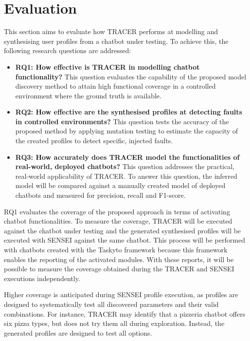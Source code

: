 
\chapter{Evaluation}\label{chapter:evaluation}

This section aims to
evaluate how \ac{TRACER} performs at
modelling and synthesising user profiles
from a chatbot under testing.
To achieve this, the following research questions are addressed:

\begin{itemize}
\item \textbf{RQ1: How effective is TRACER in modelling chatbot functionality?}
  This question evaluates the capability of the proposed model discovery method to attain high functional coverage in a controlled environment where the ground truth is available.
\item \textbf{RQ2: How effective are the synthesised profiles at detecting faults in controlled environments?}
  This question tests the accuracy of the proposed method by applying mutation testing \autocite{gomez-abajoMutationTestingTaskOriented2024} to estimate the capacity of the created profiles to detect specific, injected faults.
\item \textbf{RQ3: How accurately does TRACER model the functionalities of real-world, deployed chatbots?}
  This question addresses the practical, real-world applicability of \ac{TRACER}.
  To answer this question, the inferred model will be compared against a manually created model of deployed chatbots and measured for precision, recall and F1-score.
\end{itemize}

RQ1 evaluates the coverage of the proposed approach
in terms of activating chatbot functionalities.
To measure the coverage, \ac{TRACER} will be executed
against the chatbot under testing
and the generated synthesised profiles
will be executed with SENSEI against the same chatbot.
This process will be performed with chatbots created with the Taskyto framework
because this framework enables the reporting of the activated modules.
With these reports, it will be possible to measure
the coverage obtained during the \ac{TRACER} and SENSEI executions independently.

Higher coverage is anticipated during SENSEI profile execution,
as profiles are designed to systematically test all discovered parameters
and their valid combinations.
For instance, \ac{TRACER} may identify that a pizzeria chatbot
offers six pizza types, but does not try them all during exploration.
Instead, the generated profiles are designed to test all options.

